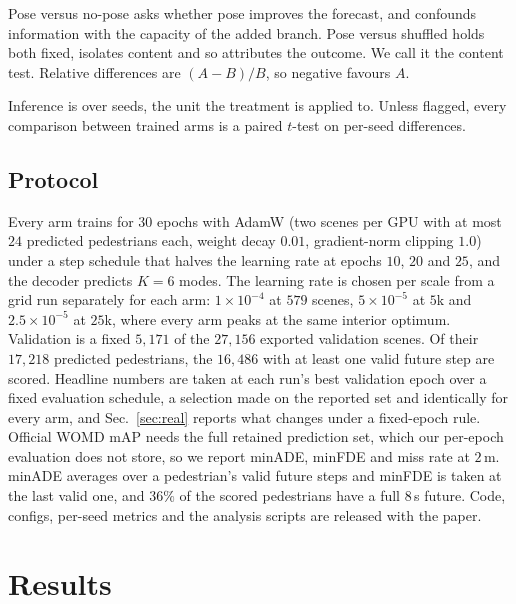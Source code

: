 \documentclass[conference]{IEEEtran}
\newcommand{\minADE}{minADE\xspace}
\newcommand{\minFDE}{minFDE\xspace}
\begin{document}
Pose versus no-pose asks whether pose improves the forecast, and confounds
information with the capacity of the added branch. Pose versus shuffled
holds both fixed, isolates content and so attributes the outcome. We call it
the content test. Relative differences are $(A-B)/B$, so negative favours $A$.

Inference is over seeds, the unit the treatment is applied to. Unless flagged,
every comparison between trained arms is a paired $t$-test on per-seed
differences.

\subsection{Protocol}
\label{sec:protocol}
Every arm trains for $30$ epochs with AdamW (two scenes per GPU with at most $24$ predicted pedestrians each, weight decay
$0.01$, gradient-norm clipping $1.0$) under a step schedule that halves the
learning rate at epochs $10$, $20$ and $25$, and the decoder predicts $K{=}6$ modes.
The learning rate is chosen per scale from a grid run separately for each arm:
$1{\times}10^{-4}$ at $579$ scenes, $5{\times}10^{-5}$ at $5$k and
$2.5{\times}10^{-5}$ at $25$k, where every arm peaks at the same interior
optimum. Validation is a fixed $5{,}171$ of the $27{,}156$ exported validation scenes. Of their $17{,}218$ predicted pedestrians, the $16{,}486$ with at least one valid future step are scored. Headline
numbers are taken at each run's best validation epoch
over a fixed evaluation schedule, a selection made on the reported set and
identically for every arm, and Sec.~\ref{sec:real} reports what changes
under a fixed-epoch rule. Official WOMD mAP needs the full retained prediction
set, which our per-epoch evaluation does not store, so we report \minADE,
\minFDE and miss rate at $2$\,m. \minADE averages over a
pedestrian's valid future steps and \minFDE is taken at the last valid one, and
$36\%$ of the scored pedestrians have a full $8$\,s future. Code, configs, per-seed metrics
and the analysis scripts are released with the paper.

\section{Results}
\end{document}
